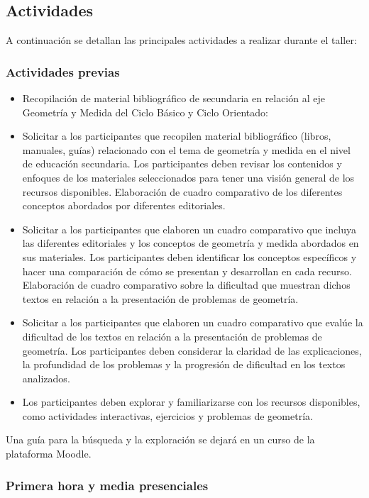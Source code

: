 \subsection{Actividades}

A continuación se detallan las principales actividades a realizar
durante el taller:

\subsubsection{Actividades previas}
\begin{itemize}
	\item Recopilación de material bibliográfico de secundaria en relación al eje Geometría y Medida del Ciclo Básico y Ciclo Orientado: \textcite{meccts2011}
	\item Solicitar a los participantes que recopilen material bibliográfico (libros, manuales, guías) relacionado con el tema de geometría y medida en el nivel de educación secundaria. Los participantes deben revisar los contenidos y enfoques de los materiales seleccionados para tener una visión general de los recursos disponibles. Elaboración de cuadro comparativo de los diferentes conceptos abordados por diferentes editoriales.
	\item Solicitar a los participantes que elaboren un cuadro comparativo que incluya las diferentes editoriales y los conceptos de geometría y medida abordados en sus materiales. Los participantes deben identificar los conceptos específicos y hacer una comparación de cómo se presentan y desarrollan en cada recurso. Elaboración de cuadro comparativo sobre la dificultad que muestran dichos textos en relación a la presentación de problemas de geometría.
	\item Solicitar a los participantes que elaboren un cuadro comparativo que evalúe la dificultad de los textos en relación a la presentación de problemas de geometría. Los participantes deben considerar la claridad de las explicaciones, la profundidad de los problemas y la progresión de dificultad en los textos analizados. 
	\item Los participantes deben explorar y familiarizarse con los recursos disponibles, como actividades interactivas, ejercicios y problemas de geometría.
\end{itemize}

Una guía para la búsqueda y la exploración se dejará en un curso de la plataforma Moodle.

\subsubsection{Primera hora y media presenciales}

